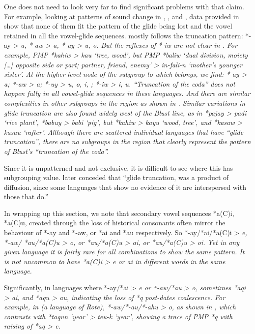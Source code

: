 One does not need to look very far to find significant problems with that claim.
For example, looking at patterns of sound change in ,
,  and , data provided in \citet[92]{Blust2008}
show that none of them fit the pattern of the glide being lost
and the vowel retained in all the vowel-glide sequences.
 mostly follows the truncation pattern: *-ay > \it{a},
*-aw > \it{a}, *-uy > \it{u, o}.
But the reflexes of *-iw are not clear in .
For example, PMP *kahiw >  \it{kau} ‘tree,
wood’, but PMP *baliw ‘dual division,
moiety [\ldots] opposite side or part; partner,
friend, enemy’
>  \it{in-fali-n} ‘mother’s younger sister’.
At the higher level node of the  subgroup to which
 belongs, we find: *-ay > \it{a}; *-aw > \it{a}; *-uy > \it{u,
o, i,} {\0}; *-iw > \it{i, u}.
“Truncation of the coda” does not happen fully in all vowel-glide
sequences in these  languages.
And there are similar complexities in other subgroups in the
region as shown in .
Similar variations in glide truncation are also found widely
west of the Blust line,
as in  *pajay > \it{padi} ‘rice plant’,
*babuy > \it{babi} ‘pig’,
but *kahiw > \it{kayu} ‘wood,
tree’, and *kasaw > \it{kasau} ‘rafter’.
Although there are scattered individual languages that have “glide
truncation”, there are no subgroups in the region that clearly represent the
pattern of Blust’s “truncation of the coda”.

Since it is unpatterned
and not exclusive, it is difficult to see where this has subgrouping value.
\citet[72]{Blust2009} later conceded that “glide truncation,
was a product of diffusion,
since some languages that show no evidence of it are interspersed
with those that do.”

In wrapping up this section,
we note that secondary vowel sequences *a(C)i,
*a(C)u, created through the loss of historical consonants often
mirror the behaviour of *-ay
and *-aw, or *ai and *au respectively.
So *-ay/*ai/*a(C)i > \it{e},
\mbox{*-aw}/ *au/*a(C)u > \it{o}, or *au/*a(C)u > \it{ai},
or *au/*a(C)u > \it{oi}.
Yet in any given language it is fairly rare for all combinations
to show the same pattern.
It is not uncommon to have *a(C)i > \it{e} or \it{ai} in different
words in the same language.

Significantly, in languages where *-ay/*ai > \it{e} or *-aw/*au
> \it{o}, sometimes *aqi > \it{ai},
and *aqu > \it{au},
indicating the loss of *q post-dates coalescence.
For example, in  (a  language of Rote),
*-aw/*-au/*-ahu > \it{o}, as shown in ,
which contrasts with *taqun ‘year’ > \it{teu-k} ‘year’,
showing a trace of PMP *q with raising of *aq > \it{e}.

